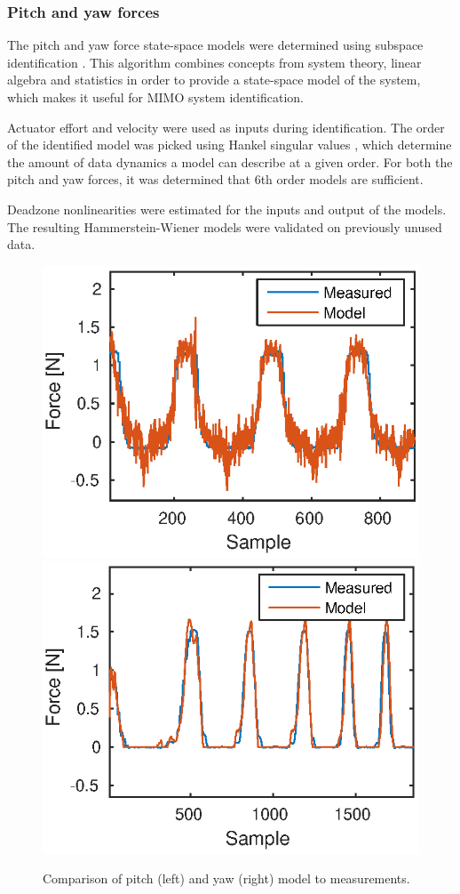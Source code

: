 \subsubsection{Pitch and yaw forces}
The pitch and yaw force state-space models were determined using subspace identification  \cite{van2012subspace}. This algorithm combines concepts from system theory, linear algebra and statistics in order to provide a state-space model of the system, which makes it useful for MIMO system identification. 

Actuator effort and velocity were used as inputs during identification.
The order of the identified model was picked using Hankel singular values \cite{gawronski1990model}, which determine the amount of data dynamics a model can describe at a given order. For both the pitch and yaw forces, it was determined that 6th order models are sufficient. 

Deadzone nonlinearities were estimated for the inputs and output of the models. 
The resulting Hammerstein-Wiener models were validated on previously unused data.

 \begin{figure}[h]
 \centering
 \includegraphics[width=0.49\linewidth]{modelpitch2_a}
 \includegraphics[width=0.49\linewidth]{modelyaw_a}
 \caption{Comparison of pitch (left) and yaw (right) model to measurements.}
 \label{fig:final_res_yaw}
 \end{figure}



